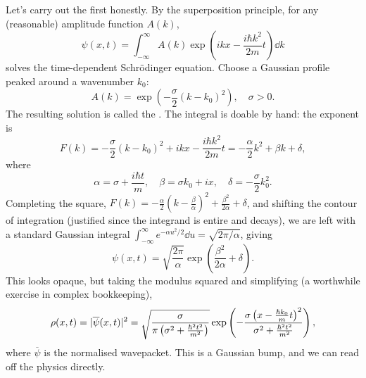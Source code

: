 \documentclass[a4paper]{scrartcl}
\begin{document}
Let's carry out the first honestly. By the superposition principle, for any (reasonable) amplitude function $A(k)$,
$$
\psi(x, t) = \int_{-\infty}^{\infty} A(k) \exp\left(ikx - \frac{i \hbar k^2}{2m}t\right) \dd k
$$
solves the time-dependent Schr\"odinger equation. Choose a Gaussian profile peaked around a wavenumber $k_0$:
$$
A(k) = \exp\left( -\frac{\sigma}{2}(k - k_0)^2 \right), \quad \sigma > 0.
$$
The resulting solution is called the . The integral is doable by hand: the exponent is
$$
F(k) = -\frac{\sigma}{2}(k - k_0)^2 + ikx - \frac{i \hbar k^2}{2m} t = -\frac{\alpha}{2} k^2 + \beta k + \delta,
$$
where
$$
\alpha = \sigma + \frac{i \hbar t}{m}, \quad \beta = \sigma k_0 + i x, \quad \delta = -\frac{\sigma}{2} k_0^2.
$$
Completing the square, $F(k) = -\frac{\alpha}{2}\left(k - \frac{\beta}{\alpha}\right)^2 + \frac{\beta^2}{2 \alpha} + \delta$, and shifting the contour of integration (justified since the integrand is entire and decays), we are left with a standard Gaussian integral $\int_{-\infty}^\infty e^{-\alpha u^2/2} \dd u = \sqrt{2\pi/\alpha}$, giving
$$
\psi(x, t) = \sqrt{\frac{2 \pi}{\alpha}} \exp\left( \frac{\beta^2}{2\alpha} + \delta \right).
$$
This looks opaque, but taking the modulus squared and simplifying (a worthwhile exercise in complex bookkeeping),
$$
\rho(x, t) = \lvert\overline{\psi}(x,t)\rvert^2 = \sqrt{\frac{\sigma}{\pi\left(\sigma^2 + \frac{\hbar^2 t^2}{m^2}\right)}} \exp\left( -\frac{\sigma \left(x - \frac{\hbar k_0}{m} t\right)^2}{\sigma^2 + \frac{\hbar^2 t^2}{m^2}} \right),
$$
where $\overline{\psi}$ is the normalised wavepacket. This is a Gaussian bump, and we can read off the physics directly.
\end{document}
